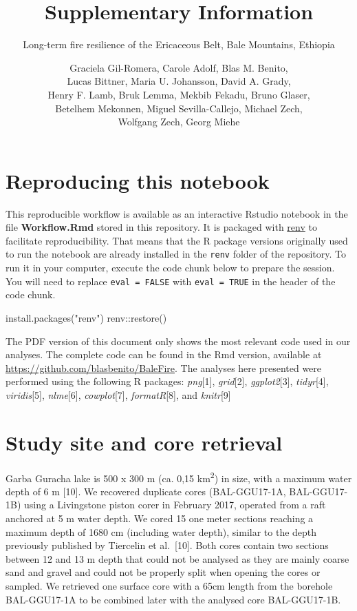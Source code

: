 \documentclass[
]{article}
\title{Supplementary Information}
\subtitle{Long-term fire resilience of the Ericaceous Belt, Bale
Mountains, Ethiopia}
\author{Graciela Gil-Romera, Carole Adolf, Blas M. Benito,\\
Lucas Bittner, Maria U. Johansson, David A. Grady,\\
Henry F. Lamb, Bruk Lemma, Mekbib Fekadu, Bruno Glaser,\\
Betelhem Mekonnen, Miguel Sevilla-Callejo, Michael Zech,\\
Wolfgang Zech, Georg Miehe}
\date{}
\newenvironment{Shaded}{\begin{snugshade}}{\end{snugshade}}
\newcommand{\FunctionTok}[1]{\textcolor[rgb]{0.00,0.00,0.00}{#1}}
\newcommand{\NormalTok}[1]{#1}
\newcommand{\SpecialCharTok}[1]{\textcolor[rgb]{0.00,0.00,0.00}{#1}}
\newcommand{\StringTok}[1]{\textcolor[rgb]{0.31,0.60,0.02}{#1}}
\begin{document}
\maketitle

{
\hypersetup{linkcolor=}
\setcounter{tocdepth}{2}
\tableofcontents
}
\newpage

\hypertarget{reproducing-this-notebook}{%
\section{Reproducing this notebook}\label{reproducing-this-notebook}}

This reproducible workflow is available as an interactive Rstudio
notebook in the file \textbf{Workflow.Rmd} stored in this repository. It
is packaged with \href{https://cran.r-project.org/package=renv}{renv} to
facilitate reproducibility. That means that the R package versions
originally used to run the notebook are already installed in the
\texttt{renv} folder of the repository. To run it in your computer,
execute the code chunk below to prepare the session. You will need to
replace \texttt{eval\ =\ FALSE} with \texttt{eval\ =\ TRUE} in the
header of the code chunk.

\begin{Shaded}
\begin{Highlighting}[]
\FunctionTok{install.packages}\NormalTok{(}\StringTok{"renv"}\NormalTok{)}
\NormalTok{renv}\SpecialCharTok{::}\FunctionTok{restore}\NormalTok{()}
\end{Highlighting}
\end{Shaded}

The PDF version of this document only shows the most relevant code used
in our analyses. The complete code can be found in the Rmd version,
available at \url{https://github.com/blasbenito/BaleFire}. The analyses
here presented were performed using the following R packages:
\emph{png}{[}1{]}, \emph{grid}{[}2{]}, \emph{ggplot2}{[}3{]},
\emph{tidyr}{[}4{]}, \emph{viridis}{[}5{]}, \emph{nlme}{[}6{]},
\emph{cowplot}{[}7{]}, \emph{formatR}{[}8{]}, and \emph{knitr}{[}9{]}

\newpage

\hypertarget{study-site-and-core-retrieval}{%
\section{Study site and core
retrieval}\label{study-site-and-core-retrieval}}

Garba Guracha lake is 500 x 300 m (ca. 0,15 km\textsuperscript{2}) in
size, with a maximum water depth of 6 m {[}10{]}. We recovered duplicate
cores (BAL-GGU17-1A, BAL-GGU17-1B) using a Livingstone piston corer in
February 2017, operated from a raft anchored at 5 m water depth. We
cored 15 one meter sections reaching a maximum depth of 1680 cm
(including water depth), similar to the depth previously published by
Tiercelin et al.~{[}10{]}. Both cores contain two sections between 12
and 13 m depth that could not be analysed as they are mainly coarse sand
and gravel and could not be properly split when opening the cores or
sampled. We retrieved one surface core with a 65cm length from the
borehole BAL-GGU17-1A to be combined later with the analysed core
BAL-GGU17-1B.
\end{document}

